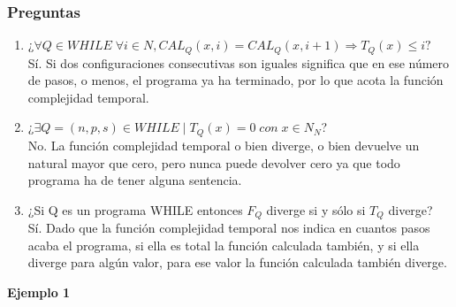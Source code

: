 \documentclass[xcolor=table]{beamer}
\begin{document}
\begin{frame}[fragile]\frametitle{Preguntas} \footnotesize

\begin{enumerate}\footnotesize


    
    \item ¿$\forall Q \in WHILE\; \forall i \in N, CAL_Q(x,i) = CAL_Q (x,i+1) \Rightarrow T_Q(x) \leq i?$ \\
    \hspace{0.3cm} \scriptsize  \textcolor{chicagoblue}{Sí.	Si	dos	configuraciones	consecutivas	son	iguales	significa	que	en	ese	número	de	pasos,	o	menos,	el	programa	ya	ha terminado,	por	lo	que	acota	la	función	complejidad	temporal.}
    \footnotesize
    
    
    \item  ¿$\exists Q = (n,p,s) \in WHILE\; |\; T_Q(x) =0 \;con\; x \in N_N$?\\
        \hspace{0.3cm} \scriptsize \textcolor{chicagoblue}{No.	La	función	complejidad	temporal	o	bien	diverge,	o	bien	devuelve	un	natural	mayor	que	cero,	pero	nunca	puede devolver	cero	ya	que	todo	programa	ha	de	tener	alguna	sentencia.}
    \footnotesize
    
    \item ¿Si	Q	es	un	programa	WHILE	entonces	$F_Q$	diverge	si	y	sólo	si	$T_Q$	diverge?\\
        \hspace{0.3cm} \scriptsize \textcolor{chicagoblue}{Sí.	Dado	que	la	función	complejidad	temporal	nos	indica	en	cuantos	pasos	acaba	el	programa,	si	ella	es	total	la	
función	calculada	también,	y	si	ella	diverge	para	algún	valor,	para	ese	valor	la	función	calculada	también	diverge.}
    
       
\end{enumerate}


\end{frame}


\begin{frame}  \Large

\begin{center}
    \textbf{Ejemplo 1 }
\end{center}

\end{frame} 
\end{document}
